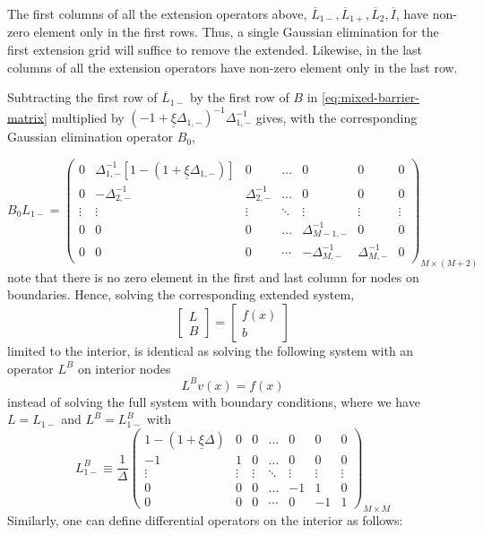 \documentclass[11pt]{article}
\theoremstyle{definition}
\begin{document}
The first columns of all the extension operators above, $\overline{L}_{1-}, \overline{L}_{1+}, \overline{L}_{2}, \overline{I}$, have non-zero element only in the first rows. Thus, a single Gaussian elimination for the first extension grid will suffice to remove the extended. Likewise, in the last columns of all the extension operators have non-zero element only in the last row.

Subtracting the first row of $\overline{L}_{1-}$ by the first row of $B$ in \eqref{eq:mixed-barrier-matrix} multiplied by $(-1 + \underline{\xi} \Delta_{1,-} )^{-1}\Delta_{1,-}^{-1}$ gives, with the corresponding Gaussian elimination operator $B_0$,

\begin{equation}
B_0 {L}_{1-} = \begin{pmatrix}
0&\Delta_{1,-}^{-1} \left[ 1 - (1+\underline{\xi} \Delta_{1,-} )\right] &0&\dots&0&0&0\\
0&-\Delta_{2,-}^{-1}&\Delta_{2,-}^{-1}&\dots&0&0&0\\
\vdots&\vdots&\vdots&\ddots&\vdots&\vdots&\vdots\\
0&0&0&\dots&\Delta_{M-1,-}^{-1}&0&0\\
0&0&0&\cdots&-\Delta_{M,-}^{-1}&\Delta_{M,-}^{-1}&0
\end{pmatrix}_{M\times (M+2)}
\end{equation}
note that there is no zero element in the first and last column for nodes on boundaries. Hence, solving the corresponding extended system,
\begin{equation}
\begin{bmatrix}
{L}\\
B
\end{bmatrix} =
\begin{bmatrix}
f(x) \\ b
\end{bmatrix}
\end{equation}
limited to the interior, is identical as solving the following system with an operator $L^B$ on interior nodes
\begin{equation}
L^B v(x) = f(x)
\end{equation}
instead of solving the full system with boundary conditions, where we have ${L} = {L}_{1-}$ and $L^B = L_{1-}^B$ with
\begin{equation}
L_{1-}^B \equiv \frac{1}{\Delta}\begin{pmatrix}
1 - (1 + \underline{\xi} \Delta) &0&0&\dots&0&0&0\\
-1&1&0&\dots&0&0&0\\
\vdots&\vdots&\vdots&\ddots&\vdots&\vdots&\vdots\\
0&0&0&\dots&-1&1&0\\
0&0&0&\cdots&0&-1&1
\end{pmatrix}_{M\times M}
\end{equation}
Similarly, one can define differential operators on the interior as follows:
\end{document}
